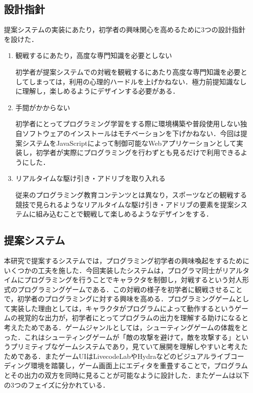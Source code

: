 \subsection{設計指針}

提案システムの実装にあたり，初学者の興味関心を高めるために3つの設計指針を設けた．

\begin{enumerate}
	\item 観戦するにあたり，高度な専門知識を必要としない
	
	初学者が提案システムでの対戦を観戦するにあたり高度な専門知識を必要としてしまっては，利用の心理的ハードルを上げかねない．極力前提知識なしに理解し，楽しめるようにデザインする必要がある．
	
	\item 手間がかからない

	初学者にとってプログラミング学習をする際に環境構築や普段使用しない独自ソフトウェアのインストールはモチベーションを下げかねない．今回は提案システムをJavaScriptによって制御可能なWebアプリケーションとして実装し，初学者が実際にプログラミングを行わずとも見るだけで利用できるようにした．
	
	\item リアルタイムな駆け引き・アドリブを取り入れる

	従来のプログラミング教育コンテンツとは異なり，スポーツなどの観戦する競技で見られるようなリアルタイムな駆け引き・アドリブの要素を提案システムに組み込むことで観戦して楽しめるようなデザインをする．
\end{enumerate}

\subsection{提案システム}

本研究で提案するシステムでは，プログラミング初学者の興味喚起をするためにいくつかの工夫を施した．今回実装したシステムは，プログラマ同士がリアルタイムにプログラミングを行うことでキャラクタを制御し，対戦するという対人形式のプログラミングゲームである．この対戦の様子を初学者に観戦させることで，初学者のプログラミングに対する興味を高める．プログラミングゲームとして実装した理由としては，キャラクタがプログラムによって動作するというゲームの視覚的な出力が，初学者にとってプログラムの出力を理解する助けになると考えたためである．ゲームジャンルとしては，シューティングゲームの体裁をとった．これはシューティングゲームが「敵の攻撃を避けて，敵を攻撃する」というプリミティブなゲームシステムであり，見ていて展開を理解しやすいと考えたためである．またゲームUIはLivecodeLabやHydraなどのビジュアルライブコーディング環境を踏襲し，ゲーム画面上にエディタを重畳することで，プログラムとその出力の双方を同時に見ることが可能なように設計した．またゲームは以下の3つのフェイズに分かれている．

